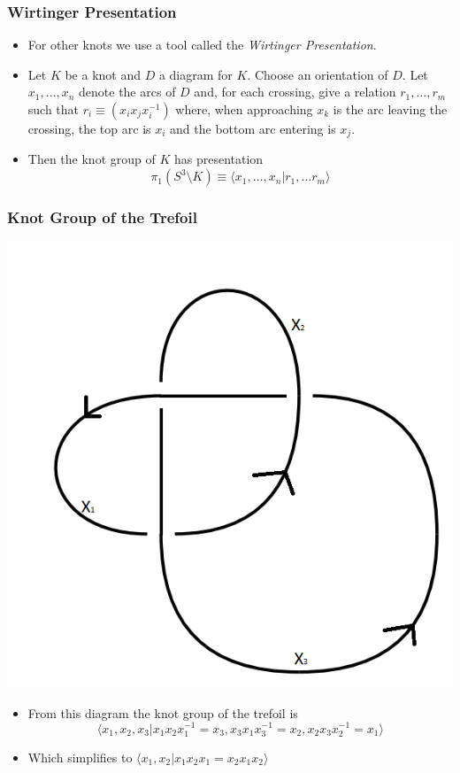 \documentclass{beamer}
\begin{document}
\begin{frame}
  \frametitle{Wirtinger Presentation}
  \begin{itemize}
  \item For other knots we use a tool called the \textit{Wirtinger Presentation}.
  \item Let $K$ be a knot and $D$ a diagram for $K$. Choose an orientation of $D$.
    Let $x_1,\ldots, x_n$ denote the arcs of $D$ and, for each crossing, give a
    relation $r_1,\ldots, r_m$ such that $r_i\equiv (x_i x_j x_i^{-1})$ where, when approaching
    $x_k$ is the arc leaving the crossing, the top arc is $x_i$ and the bottom arc entering
    is $x_j$.
  \item Then the knot group of $K$ has presentation
    \[
      \pi_1(S^3\setminus K) \equiv \langle x_1,\ldots, x_n| r_1,\ldots r_m\rangle
    \]
  \end{itemize}
\end{frame}

\begin{frame}
  \frametitle{Knot Group of the Trefoil}
  \begin{center}
    \includegraphics[scale=.25]{annotated-trefoil}
  \end{center}
  \begin{itemize}
  \item From this diagram the knot group of the trefoil is 
    \[
      \langle x_1,x_2,x_3|x_1x_2x_1^{-1}=x_3,x_3x_1x_3^{-1}=x_2,x_2x_3x_2^{-1}=x_1\rangle
    \]
  \item Which simplifies to $\langle x_1,x_2|x_1 x_2 x_1= x_2 x_1 x_2\rangle$
  \end{itemize}
\end{frame}
\end{document}
